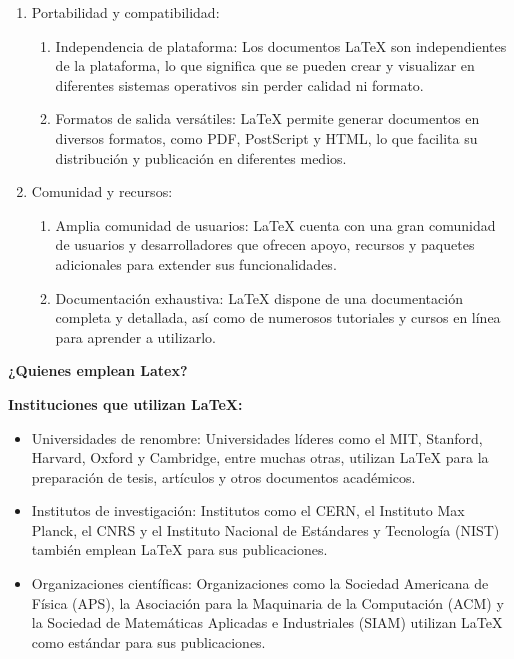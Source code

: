 \documentclass[10pt]{article}
\begin{document}
\begin{enumerate}
\begin{enumerate}
    \end{enumerate}
	\item Portabilidad y compatibilidad:
	\begin{enumerate}
        \item Independencia de plataforma: Los documentos LaTeX son independientes de la plataforma, lo que significa que se pueden crear y visualizar en diferentes sistemas operativos sin perder calidad ni formato.
        \item Formatos de salida versátiles: LaTeX permite generar documentos en diversos formatos, como PDF, PostScript y HTML, lo que facilita su distribución y publicación en diferentes medios.   
    \end{enumerate}
    \item Comunidad y recursos:
    \begin{enumerate}
        \item Amplia comunidad de usuarios: LaTeX cuenta con una gran comunidad de usuarios y desarrolladores que ofrecen apoyo, recursos y paquetes adicionales para extender sus funcionalidades.
        \item Documentación exhaustiva: LaTeX dispone de una documentación completa y detallada, así como de numerosos tutoriales y cursos en línea para aprender a utilizarlo.  
    \end{enumerate}
\end{enumerate} 
 
{\raggedleft \textbf{¿Quienes emplean Latex?}}

{\raggedleft \textbf{Instituciones que utilizan LaTeX:}}

\begin{itemize}
	\item Universidades de renombre: Universidades líderes como el MIT, Stanford, Harvard, Oxford y Cambridge, entre muchas otras, utilizan LaTeX para la preparación de tesis, artículos y otros documentos académicos.
	\item Institutos de investigación: Institutos como el CERN, el Instituto Max Planck, el CNRS y el Instituto Nacional de Estándares y Tecnología (NIST) también emplean LaTeX para sus publicaciones.
	\item Organizaciones científicas: Organizaciones como la Sociedad Americana de Física (APS), la Asociación para la Maquinaria de la Computación (ACM) y la Sociedad de Matemáticas Aplicadas e Industriales (SIAM) utilizan LaTeX como estándar para sus publicaciones.
\end{itemize}
\end{document}
